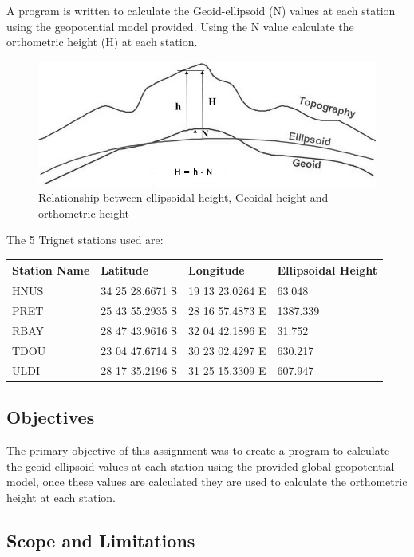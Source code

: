 \documentclass[12pt,a4paper]{article}
\begin{document}
	A program is written to calculate the Geoid-ellipsoid (N) values at each station using the geopotential model provided. Using the N value calculate the orthometric height (H) at each station.
	
	\begin{figure}[H]
		\centering
		\includegraphics[width=0.7\linewidth]{threeheights_e(1)}
		\caption{Relationship between ellipsoidal height, Geoidal height and orthometric height}
		\label{fig:threeheights}
	\end{figure}
	
	The 5 Trignet stations used are:
	
	\begin{center}
		\begin{tabular}{ | l | l | l | l |}
			\hline
			Station Name & Latitude & Longitude & Ellipsoidal Height \\ \hline
			HNUS & 34 25 28.6671 S & 19 13 23.0264 E &   63.048 \\ \hline
			PRET & 25 43 55.2935 S & 28 16 57.4873 E & 1387.339 \\ \hline
			RBAY & 28 47 43.9616 S & 32 04 42.1896 E &   31.752 \\ \hline
			TDOU & 23 04 47.6714 S & 30 23 02.4297 E &  630.217 \\ \hline
			ULDI & 28 17 35.2196 S & 31 25 15.3309 E &  607.947 \\
			
			\hline
			
		\end{tabular}
	\end{center}
	
	\subsection{Objectives}
	
	The primary objective of this assignment was to create a program to calculate the geoid-ellipsoid values at each station using the provided global geopotential model, once these values are calculated they are used to calculate the orthometric height at each station.	
	
	\subsection{Scope and Limitations}
	
\end{document}
